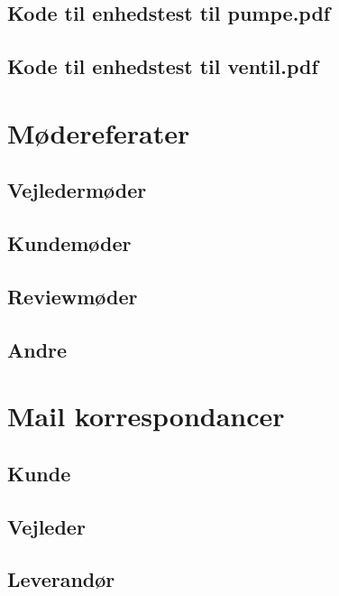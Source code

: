 \subsection{Kode til enhedstest til pumpe.pdf}
\label{bilag:TKpumpe}

\subsection{Kode til enhedstest til ventil.pdf}
\label{bilag:TKventil}

\section{Mødereferater}
\label{mode}

\subsection{Vejledermøder}
\label{modevejleder}

\subsection{Kundemøder}
\label{modekunde}

\subsection{Reviewmøder}
\label{moderefreview}

\subsection{Andre}
\label{moderefAndre}

\section{Mail korrespondancer}
\label{mails}

\subsection{Kunde}
\label{mailKunde}

\subsection{Vejleder}
\label{mailvejleder}

\subsection{Leverandør}
\label{mailleverandor}

